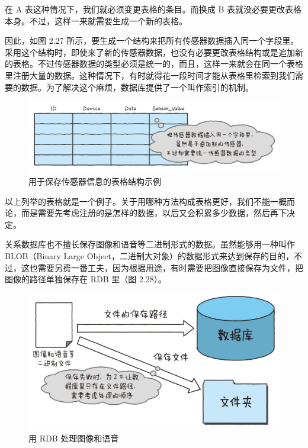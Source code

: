 \documentclass[12pt,UTF8]{ctexbook}
\begin{document}
在 A 表这种情况下，我们就必须变更表格的条目。而换成 B 表就没必要更改表格本身。不过，这样一来就需要生成一个新的表格。

因此，如图 2.27 所示，要生成一个结构来把所有传感器数据插入同一个字段里。采用这个结构时，即使来了新的传感器数据，也没有必要更改表格结构或是追加新的表格。不过传感器数据的类型必须是统一的，而且，这样一来就会在同一个表格里注册大量的数据。这种情况下，有时就得花一段时间才能从表格里检索到我们需要的数据。为了解决这个麻烦，数据库提供了一个叫作索引的机制。

\begin{figure}[htbp]
	\centering
	\includegraphics[width=1\linewidth]{46}
	\caption{用于保存传感器信息的表格结构示例}
	\label{fig:1}
\end{figure}

以上列举的表格就是一个例子。关于用哪种方法构成表格更好，我们不能一概而论，而是需要先考虑注册的是怎样的数据，以后又会积累多少数据，然后再下决定。

关系数据库也不擅长保存图像和语音等二进制形式的数据。虽然能够用一种叫作 BLOB（Binary Large Object，二进制大对象）的数据形式来达到保存的目的，不过，这也需要另费一番工夫，因为根据用途，有时需要把图像直接保存为文件，把图像的路径单独保存在 RDB 里（图 2.28）。

\begin{figure}[htbp]
	\centering
	\includegraphics[width=1\linewidth]{47}
	\caption{用 RDB 处理图像和语音}
	\label{fig:1}
\end{figure}
\end{document}
